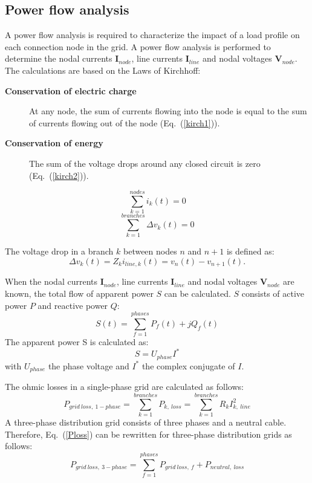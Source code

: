 \subsection{Power flow analysis}
A power flow analysis is required to characterize the impact of a load profile on each connection node in the grid. A power flow analysis is performed to determine the nodal currents $\textbf{I}_{node}$, line currents $\textbf{I}_{line}$ and nodal voltages $\textbf{V}_{node}$. The calculations are based on the Laws of Kirchhoff:
\begin{description}
\item[\textbf{Conservation of electric charge}] At any node, the sum of currents flowing into the node is equal to the sum of currents flowing out of the node (Eq.~(\ref{kirch1})).
\item[\textbf{Conservation of energy}] The sum of the voltage drops around any closed circuit is zero (Eq.~(\ref{kirch2})).
\end{description}

\begin{equation}
\sum_{k = 1}^{nodes} i_{k}(t) = 0
\label{kirch1}
\end{equation}
\begin{equation}
\sum_{k = 1}^{branches} \Delta v_{k}(t) = 0
\label{kirch2}
\end{equation}

The voltage drop in a branch $k$ between nodes $n$ and $n+1$ is defined as:
\begin{equation}
\Delta v_k(t) = Z_k i_{line,k}(t) = v_n(t) - v_{n+1}(t).
\end{equation}

When the nodal currents $\textbf{I}_{node}$, line currents $\textbf{I}_{line}$ and nodal voltages $\textbf{V}_{node}$ are known, the total flow of apparent power $S$ can be calculated. $S$ consists of active power $P$ and reactive power $Q$:
\begin{equation}
S(t) = \sum_{f = 1}^{phases}P_f(t) + j Q_f(t)%
\end{equation}
The apparent power S is calculated as:
\begin{equation}
S = U_{phase} I^*
\end{equation}
with $U_{phase}$ the phase voltage and $I^*$ the complex conjugate of $I$.

The ohmic losses in a single-phase grid are calculated as follows:
\begin{equation}
P_{grid~loss,~1-phase} = \sum_{k = 1}^{branches} P_{k,~loss} = \sum_{k = 1}^{branches} R_k I_{k,~line}^{2} 
\label{Ploss}
\end{equation}
A three-phase distribution grid consists of three phases and a neutral cable. Therefore, Eq.~(\ref{Ploss}) can be rewritten for three-phase distribution grids as follows:
\begin{equation}
P_{grid~loss,~3-phase} = \sum_{f = 1}^{phases} P_{grid~loss,~f} + P_{neutral,~loss} 
\label{3Ploss}
\end{equation}

